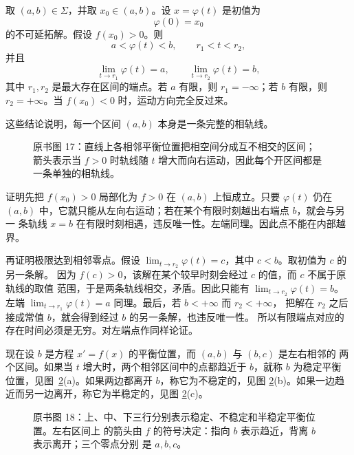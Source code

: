 取 \((a,b)\in\Sigma\)，并取 \(x_0\in(a,b)\)。设 \(x=\varphi(t)\) 是初值为
\begin{equation}
 \varphi(0)=x_0
 \tag{16}
\end{equation}
的不可延拓解。假设 \(f(x_0)>0\)。则
\begin{equation}
 a<\varphi(t)<b,\qquad r_1<t<r_2,
 \tag{17}
\end{equation}
并且
\begin{equation}
 \lim_{t\to r_1}\varphi(t)=a,\qquad
 \lim_{t\to r_2}\varphi(t)=b,
 \tag{18}
\end{equation}
其中 \(r_1,r_2\) 是最大存在区间的端点。若 \(a\) 有限，则 \(r_1=-\infty\)；若 \(b\)
有限，则 \(r_2=+\infty\)。当 \(f(x_0)<0\) 时，运动方向完全反过来。

这些结论说明，每一个区间 \((a,b)\) 本身是一条完整的相轨线。

\begin{figure}[H]
 \centering
 
 \caption{原书图 17：直线上各相邻平衡位置把相空间分成互不相交的区间；箭头表示当
 \(f>0\) 时轨线随 \(t\) 增大而向右运动，因此每个开区间都是一条单独的相轨线。}
 \label{fig:ch2-p2-17}
\end{figure}

证明先把 \(f(x_0)>0\) 局部化为 \(f>0\) 在 \((a,b)\) 上恒成立。只要 \(\varphi(t)\)
仍在 \((a,b)\) 中，它就只能从左向右运动；若在某个有限时刻越出右端点 \(b\)，就会与另一
条轨线 \(x=b\) 在有限时刻相遇，违反唯一性。左端同理。因此点不能在内部越界。

再证明极限达到相邻零点。假设
\(\lim_{t\to r_2}\varphi(t)=c\)，其中 \(c<b\)。取初值为 \(c\) 的另一条解。
因为 \(f(c)>0\)，该解在某个较早时刻会经过 \(c\) 的值，而 \(c\) 不属于原轨线的取值
范围，于是两条轨线相交，矛盾。因此只能有 \(\lim_{t\to r_2}\varphi(t)=b\)。左端
\(\lim_{t\to r_1}\varphi(t)=a\) 同理。最后，若 \(b<+\infty\) 而 \(r_2<+\infty\)，
把解在 \(r_2\) 之后接成常值 \(b\)，就会得到经过 \(b\) 的另一条解，也违反唯一性。
所以有限端点对应的存在时间必须是无穷。对左端点作同样论证。

现在设 \(b\) 是方程 \(x'=f(x)\) 的平衡位置，而 \((a,b)\) 与 \((b,c)\) 是左右相邻的
两个区间。如果当 \(t\) 增大时，两个相邻区间中的点都趋近于 \(b\)，就称 \(b\) 为稳定平衡
位置，见图~\ref{fig:ch2-p2-18}(a)。如果两边都离开 \(b\)，称它为不稳定的，见图
\ref{fig:ch2-p2-18}(b)。如果一边趋近而另一边离开，称它为半稳定的，见图
\ref{fig:ch2-p2-18}(c)。

\begin{figure}[H]
 \centering
 
 \caption{原书图 18：上、中、下三行分别表示稳定、不稳定和半稳定平衡位置。左右区间上
 的箭头由 \(f\) 的符号决定：指向 \(b\) 表示趋近，背离 \(b\) 表示离开；三个零点分别
 是 \(a,b,c\)。}
 \label{fig:ch2-p2-18}
\end{figure}

